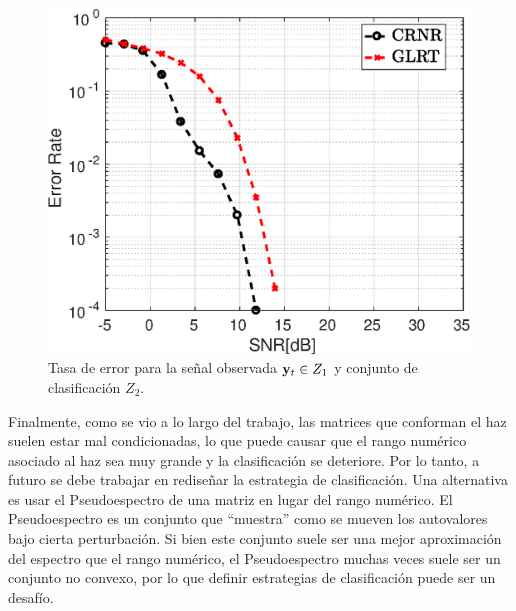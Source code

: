 			\begin{figure}[ht]
				\centering
				\includegraphics[width = 0.6 \textwidth]{Figuras/Error_rate_signal_2_VS_set_1_low_snr}
				\caption{Tasa de error para la señal observada  $\mathbf{y}_t\in Z_1$ y conjunto de clasificación $Z_2$.}
				\label{Fig:Comparation_MPM_RNR}
			\end{figure}
			
			

			Finalmente, como se vio a lo largo del trabajo, las matrices que conforman el haz suelen estar mal condicionadas, lo que puede causar que el rango numérico asociado al haz sea muy grande y la clasificación se deteriore. Por lo tanto, a futuro se debe trabajar en rediseñar la estrategia de clasificación. Una alternativa es usar el Pseudoespectro de una matriz en lugar del rango numérico. El Pseudoespectro es un conjunto que ``muestra'' como se mueven los autovalores bajo cierta perturbación. Si bien este conjunto suele ser una mejor aproximación del espectro que el rango numérico, el Pseudoespectro muchas veces suele ser un conjunto no convexo, por lo que definir estrategias de clasificación puede ser un desafío. 
			 
			
						
			
		
		
	
			
	
		
	
